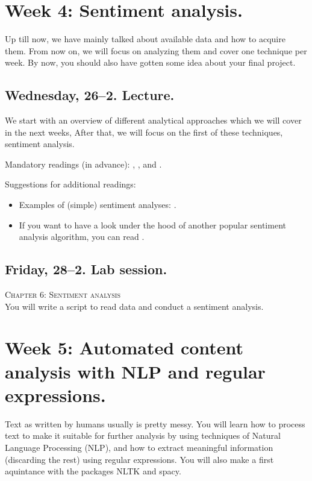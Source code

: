 \section*{Week 4: Sentiment analysis.}
Up till now, we have mainly talked about available data and how to acquire them. From now on, we will focus on analyzing them and cover one technique per week. By now, you should also have gotten some idea about your final project.


\subsection*{Wednesday, 26--2. Lecture.}
We start with an overview of different analytical approaches which we will cover in the next weeks, After that, we will focus on the first of these techniques, sentiment analysis.

Mandatory readings (in advance): \cite{GonzalezBailon2015}, \cite{Hutto2014}, and \cite{Vermeer2019}.

Suggestions for additional readings:
\begin{itemize}
	\item Examples of (simple) sentiment analyses: \cite{Huang2007,Pestian2012, Mostafa2013}. 
	\item If you want to have a look under the hood of another popular sentiment analysis algorithm, you can read \cite{Thelwall2012}.
\end{itemize}




\subsection*{Friday, 28--2. Lab session.}
\textsc{ Chapter 6: Sentiment analysis}\\
You will write a script to read data and conduct a sentiment analysis.






\section*{Week 5: Automated content analysis with NLP and regular expressions.}
Text as written by humans usually is pretty messy. You will learn how to process text to make it suitable for further analysis by using techniques of Natural Language Processing (NLP), and how to extract meaningful information (discarding the rest) using regular expressions. You will also make a first aquintance with the packages NLTK and spacy.




